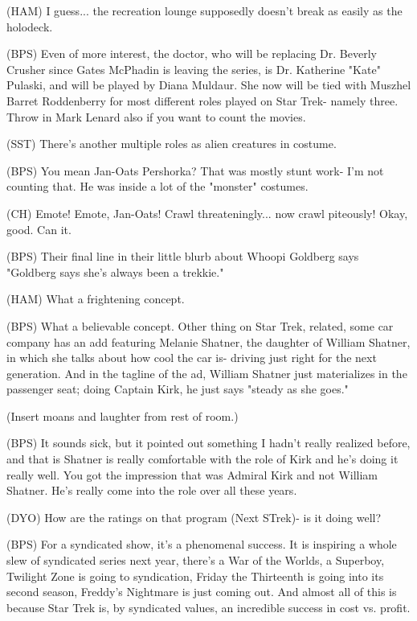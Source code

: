 \documentclass[12pt]{article}
\begin{document}
(HAM) I guess... the recreation lounge supposedly doesn't break as easily as the holodeck.

(BPS) Even of more interest, the doctor, who will be replacing Dr. Beverly Crusher since Gates McPhadin is leaving the series, is Dr. Katherine "Kate" Pulaski, and will be played by Diana Muldaur. She now will be tied with Muszhel Barret Roddenberry for most different roles played on Star Trek- namely three. Throw in Mark Lenard also if you want to count the movies.

(SST) There's another multiple roles as alien creatures in costume.

(BPS) You mean Jan-Oats Pershorka? That was mostly stunt work- I'm not counting that. He was inside a lot of the "monster" costumes.

(CH) Emote! Emote, Jan-Oats! Crawl threateningly... now crawl piteously! Okay, good. Can it.

(BPS) Their final line in their little blurb about Whoopi Goldberg says "Goldberg says she's always been a trekkie."

(HAM) What a frightening concept.

(BPS) What a believable concept. Other thing on Star Trek, related, some car company has an add featuring Melanie Shatner, the daughter of William Shatner, in which she talks about how cool the car is- driving just right for the next generation. And in the tagline of the ad, William Shatner just materializes in the passenger seat; doing Captain Kirk, he just says "steady as she goes."

(Insert moans and laughter from rest of room.)

(BPS) It sounds sick, but it pointed out something I hadn't really realized before, and that is Shatner is really comfortable with the role of Kirk and he's doing it really well. You got the impression that was Admiral Kirk and not William Shatner. He's really come into the role over all these years.

(DYO) How are the ratings on that program (Next STrek)- is it doing well?

(BPS) For a syndicated show, it's a phenomenal success. It is inspiring a whole slew of syndicated series next year, there's a War of the Worlds, a Superboy, Twilight Zone is going to syndication, Friday the Thirteenth is going into its second season, Freddy's Nightmare is just coming out. And almost all of this is because Star Trek is, by syndicated values, an incredible success in cost vs. profit.
\end{document}
